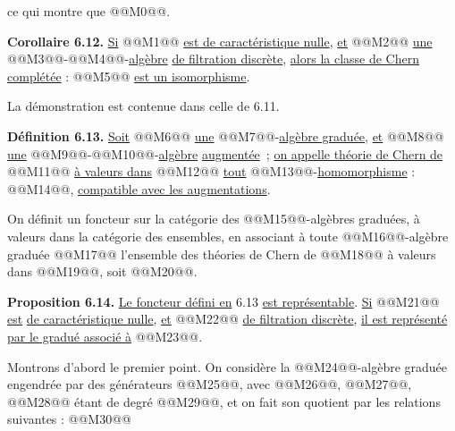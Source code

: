 
ce qui
montre que @@M0@@.

\textbf{Corollaire 6.12.} \uline{Si} @@M1@@ \uline{est de caractéristique nulle}, \uline{et} @@M2@@ \uline{une} @@M3@@-@@M4@@-\uline{algèbre} \uline{de filtration discrète}, \uline{alors la classe de Chern complétée} :
@@M5@@
\uline{est un isomorphisme}.

La démonstration est contenue dans celle de 6.11.

\textbf{Définition 6.13.} \uline{Soit} @@M6@@ \uline{une} @@M7@@-\uline{algèbre graduée}, \uline{et} @@M8@@ \uline{une} @@M9@@-@@M10@@-\uline{algèbre} \uline{augmentée}~; \uline{on appelle théorie de Chern de} @@M11@@ \uline{à valeurs dans} @@M12@@ \uline{tout} @@M13@@-\uline{homomorphisme} : @@M14@@, \uline{compatible avec les augmentations}.

On définit un foncteur sur la catégorie des @@M15@@-algèbres graduées, à valeurs dans la catégorie des ensembles, en associant à toute @@M16@@-algèbre graduée @@M17@@ l'ensemble des théories de Chern de @@M18@@ à valeurs dans @@M19@@, soit @@M20@@.

\textbf{Proposition 6.14.} \uline{Le foncteur défini en} 6.13 \uline{est représentable}. \uline{Si} @@M21@@ \uline{est} \uline{de caractéristique nulle}, \uline{et} @@M22@@ \uline{de filtration discrète}, \uline{il est représenté} \uline{par le gradué associé à} @@M23@@.

Montrons d'abord le premier point. On considère la @@M24@@-algèbre graduée engendrée par des générateurs @@M25@@, avec @@M26@@, @@M27@@, @@M28@@ étant de degré @@M29@@, et on fait son quotient par les relations suivantes :
@@M30@@
